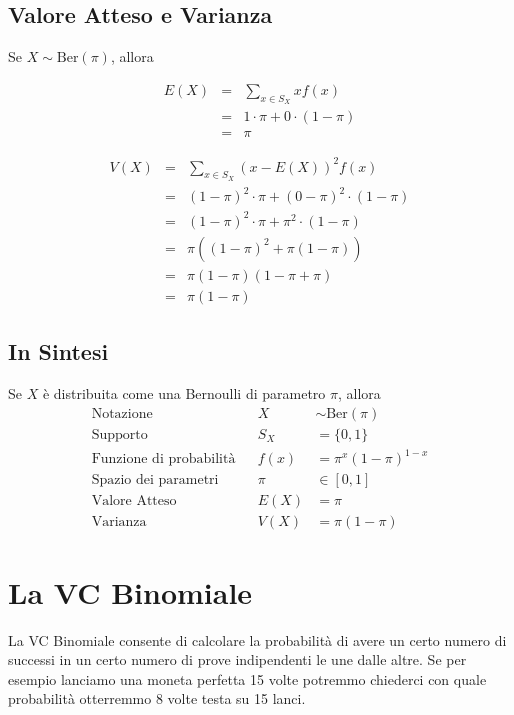 \documentclass[
  11pt,
]{book}
\theoremstyle{mytheoremstyle}
\theoremstyle{mydefstyle}
\begin{document}
\subsection{Valore Atteso e Varianza}\label{valore-atteso-e-varianza}

Se \(X\sim\text{Ber}(\pi)\), allora

\begin{eqnarray*}
E(X) &=& \sum_{x\in S_X} xf(x)\\
 &=& 1\cdot\pi+0\cdot(1-\pi)\\
 &=& \pi
\end{eqnarray*}

\begin{eqnarray*}
V(X) &=& \sum_{x\in S_X} (x-E(X))^2f(x)\\
 &=& (1-\pi)^2\cdot\pi+(0-\pi)^2\cdot(1-\pi)\\
 &=& (1-\pi)^2\cdot\pi+\pi^2\cdot(1-\pi)\\
 &=& \pi((1-\pi)^2+\pi(1-\pi))\\
 &=& \pi(1-\pi)(1-\pi+\pi)\\
 &=& \pi(1-\pi)
\end{eqnarray*}

\subsection{In Sintesi}\label{in-sintesi}

\begin{info}
Se \(X\) è distribuita come una Bernoulli di parametro \(\pi\), allora
\begin{align*}
\text{Notazione} & & X&\sim\text{Ber}(\pi)\\
\text{Supporto} & & S_X &=\{0,1\}\\
\text{Funzione di probabilità} & & f(x)&=\pi^x(1-\pi)^{1-x}\\
\text{Spazio dei parametri} & & \pi&\in[0,1]\\
\text{Valore Atteso} & & E(X)&=\pi\\
\text{Varianza} & & V(X)&=\pi(1-\pi)
\end{align*}

\end{info}

\section{La VC Binomiale}\label{la-vc-binomiale}

La VC Binomiale consente di calcolare la probabilità di avere un certo numero di successi
in un certo numero di prove indipendenti le une dalle altre.
Se per esempio lanciamo una moneta perfetta 15 volte potremmo chiederci con quale probabilità
otterremmo 8 volte testa su 15 lanci.
\end{document}
